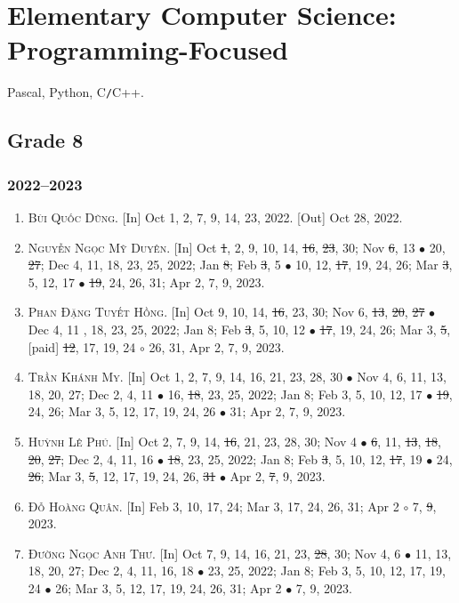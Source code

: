 \documentclass{article}
\begin{document}

\section{Elementary Computer Science: Programming-Focused}
Pascal, Python, C\texttt{/}C++.

\subsection{Grade 8}

\subsubsection{2022--2023}

\begin{enumerate}
	\item \textsc{Bùi Quốc Dũng.} \textsf{[In]} Oct 1, 2, 7, 9, 14, 23, 2022. \textsf{[Out]} Oct 28, 2022.
	\item \textsc{Nguyễn Ngọc Mỹ Duyên.} \textsf{[In]} Oct \st{1}, 2, 9, 10, 14, \st{16}, \st{23}, 30; Nov \st{6}, 13 $\bullet$ 20, \st{27}; Dec 4, 11, 18, 23, 25, 2022; Jan \st{8}; Feb \st{3}, 5 $\bullet$ 10, 12, \st{17}, 19, 24, 26; Mar \st{3}, 5, 12, 17 $\bullet$ \st{19}, 24, 26, 31; Apr 2, 7, 9, 2023.
	\item \textsc{Phan Đặng Tuyết Hồng.} \textsf{[In]} Oct 9, 10, 14, \st{16}, 23, 30; Nov 6, \st{13}, \st{20}, \st{27} $\bullet$ Dec 4, 11 , 18, 23, 25, 2022; Jan 8; Feb \st{3}, 5, 10, 12 $\bullet$ \st{17}, 19, 24, 26; Mar 3, \st{5}, [paid] \st{12}, 17, 19, 24 $\circ$ 26, 31, Apr 2, 7, 9, 2023.
	\item \textsc{Trần Khánh My.} \textsf{[In]} Oct 1, 2, 7, 9, 14, 16, 21, 23, 28, 30 $\bullet$ Nov 4, 6, 11, 13, 18, 20, 27; Dec 2, 4, 11 $\bullet$ 16, \st{18}, 23, 25, 2022; Jan 8; Feb 3, 5, 10, 12, 17 $\bullet$ \st{19}, 24, 26; Mar 3, 5, 12, 17, 19, 24, 26 $\bullet$ 31; Apr 2, 7, 9, 2023.
	\item \textsc{Huỳnh Lê Phú.} \textsf{[In]} Oct 2, 7, 9, 14, \st{16}, 21, 23, 28, 30; Nov 4 $\bullet$ \st{6}, 11, \st{13}, \st{18}, \st{20}, \st{27}; Dec 2, 4, 11, 16 $\bullet$ \st{18}, 23, 25, 2022; Jan 8; Feb \st{3}, 5, 10, 12, \st{17}, 19 $\bullet$ 24, \st{26}; Mar 3, \st{5}, 12, 17, 19, 24, 26, \st{31} $\bullet$ Apr 2, \st{7}, 9, 2023.
	\item \textsc{Đỗ Hoàng Quân.} \textsf{[In]} Feb 3, 10, 17, 24; Mar 3, 17, 24, 26, 31; Apr 2 $\circ$ 7, \st{9}, 2023.
	\item \textsc{Đường Ngọc Anh Thư.} \textsf{[In]} Oct 7, 9, 14, 16, 21, 23, \st{28}, 30; Nov 4, 6 $\bullet$ 11, 13, 18, 20, 27; Dec 2, 4, 11, 16, 18 $\bullet$ 23, 25, 2022; Jan 8; Feb 3, 5, 10, 12, 17, 19, 24 $\bullet$ 26; Mar 3, 5, 12, 17, 19, 24, 26, 31; Apr 2 $\bullet$ 7, 9, 2023.
\end{enumerate}
\end{document}
